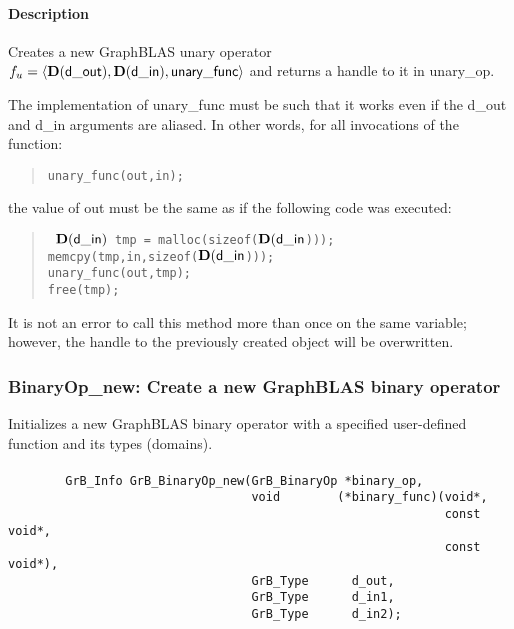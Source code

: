 \paragraph{Description}

\newenvironment{code}{\tt}{}

Creates a new GraphBLAS unary operator $f_u = \langle \mathbf{D}({\sf d\_out}), 
\mathbf{D}({\sf d\_in}), {\sf unary\_func} \rangle$ and returns a handle to it 
in {\sf unary\_op}.

The implementation of {\sf unary\_func} must be such that it works
even if the {\sf d\_out} and {\sf d\_in} arguments are aliased.
In other words, for all invocations of the function:
\begin{quote}
\begin{verbatim}
unary_func(out,in);
\end{verbatim}
\end{quote}
the value of {\sf out} must be the same as if the following code
was executed:

\begin{quote}
\begin{code}
    $\mathbf{D}({\sf d\_in})$ tmp = malloc(sizeof($\mathbf{D}({\sf d\_in}$))); \\
    memcpy(tmp,in,sizeof($\mathbf{D}({\sf d\_in}$))); \\
    unary\_func(out,tmp); \\
    free(tmp);
\end{code}
\end{quote}

It is not an error to call this method more than once on the same variable;  
however, the handle to the previously created object will be overwritten. 


\subsubsection{{\sf BinaryOp\_new}: Create a new GraphBLAS binary operator}

Initializes a new GraphBLAS binary operator with a specified user-defined 
function and its types (domains).

\paragraph{\syntax}

\begin{verbatim}
        GrB_Info GrB_BinaryOp_new(GrB_BinaryOp *binary_op,
                                  void        (*binary_func)(void*,
                                                             const void*,
                                                             const void*),
                                  GrB_Type      d_out,
                                  GrB_Type      d_in1,
                                  GrB_Type      d_in2);
\end{verbatim}

